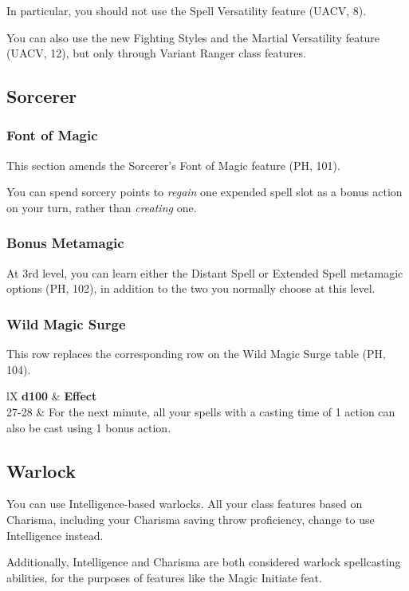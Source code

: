 \documentclass[letterpaper,twocolumn,openany,nodeprecatedcode]{dndbook}
\begin{document}
In particular, you should not use the Spell Versatility feature (UACV, 8).

You can also use the new Fighting Styles and the Martial Versatility feature (UACV, 12), but only through Variant Ranger class features.

\subsection{Sorcerer}

\subsubsection{Font of Magic}
This section amends the Sorcerer's Font of Magic feature (PH, 101).

You can spend sorcery points to \textit{regain} one expended spell slot as a bonus action on your turn, rather than \textit{creating} one.

\subsubsection{Bonus Metamagic}
At 3rd level, you can learn either the Distant Spell or Extended Spell metamagic options (PH, 102), in addition to the two you normally choose at this level.

\subsubsection{Wild Magic Surge}
This row replaces the corresponding row on the Wild Magic Surge table (PH, 104).

\begin{DndTable}[]{lX}
    \textbf{d100} & \textbf{Effect} \\
    27-28 & For the next minute, all your spells with a casting time of 1 action can also be cast using 1 bonus action.
\end{DndTable}

\subsection{Warlock}

You can use Intelligence-based warlocks. All your class features based on Charisma, including your Charisma saving throw proficiency, change to use Intelligence instead.

Additionally, Intelligence and Charisma are both considered warlock spellcasting abilities, for the purposes of features like the Magic Initiate feat.
\end{document}
